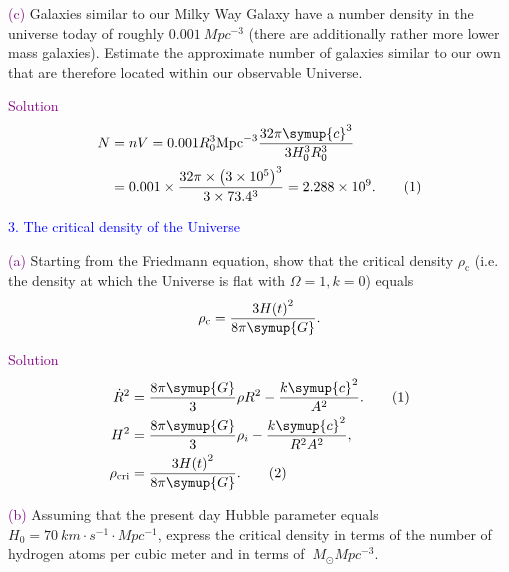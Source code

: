 \documentclass[UTF8, 12pt, a4paper, oneside, twocolumn, fontset=none]{ctexart}
\begin{document}
\noindent\textcolor{purple}{(c)} Galaxies similar to our Milky Way Galaxy have a number density in the universe today of roughly $\qty{0.001}{Mpc^{-3}}$ (there are additionally rather more lower mass galaxies). Estimate the approximate number of galaxies similar to our own that are therefore located within our observable Universe.

\hspace*{\fill}

\noindent\textcolor{purple}{Solution}
\begin{align}
N&=nV=0.001R_{0}^{3}\qty{}{Mpc^{-3}}\frac{32\pi\symup{c}^{3}}{3H_{0}^{3}R_{0}^{3}}\notag\\
&=0.001\times\frac{32\pi\times\mleft(3\times10^{5}\mright)^{3}}{3\times73.4^{3}}=\qty{2.288e9}{}.\tag{1}
\end{align}

\hspace*{\fill}

\noindent\textcolor{blue}{3. The critical density of the Universe}

\noindent\textcolor{purple}{(a)} Starting from the Friedmann equation, show that the critical density $\rho_{\mathrm{c}}$ (i.e. the density at which the Universe is flat with $\Omega=1, k=0$) equals
\begin{equation}
\rho_{\mathrm{c}}=\frac{3H\mleft(t\mright)^{2}}{8\pi\symup{G}}.\notag
\end{equation}

\hspace*{\fill}

\noindent\textcolor{purple}{Solution}
\begin{align}
\dot{R}^{2}&=\frac{8\pi\symup{G}}{3}\rho{}R^{2}-\frac{k\symup{c}^{2}}{A^{2}}.\tag{1}\\
H^{2}&=\frac{8\pi\symup{G}}{3}\rho_{i}-\frac{k\symup{c}^{2}}{R^{2}A^{2}},\notag\\
\rho_{\mathrm{cri}}&=\frac{3H\mleft(t\mright)^{2}}{8\pi\symup{G}}.\tag{2}
\end{align}

\hspace*{\fill}

\noindent\textcolor{purple}{(b)} Assuming that the present day Hubble parameter equals $H_{0}=\qty{70}{km\cdot{}s^{-1}\cdot{}Mpc^{-1}}$, express the critical density in terms of the number of hydrogen atoms per cubic meter and in terms of $\qty{}{M_{\odot}Mpc^{-3}}$.

\hspace*{\fill}
\end{document}

